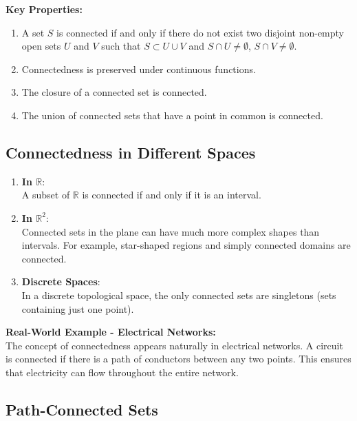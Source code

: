 \documentclass{article}
\begin{document}
\textbf{Key Properties:}
\begin{enumerate}[label=(\arabic*)]
    \item A set $S$ is connected if and only if there do not exist two disjoint non-empty open sets $U$ and $V$ such that $S \subset U \cup V$ and $S \cap U \neq \emptyset$, $S \cap V \neq \emptyset$.
    \item Connectedness is preserved under continuous functions.
    \item The closure of a connected set is connected.
    \item The union of connected sets that have a point in common is connected.
\end{enumerate}

\subsection{Connectedness in Different Spaces} \label{connectedness-spaces}

\begin{enumerate}[label=\textbf{\arabic*.}]
    \item \textbf{In $\mathbb{R}$}: \\
    A subset of $\mathbb{R}$ is connected if and only if it is an interval.
    
    \item \textbf{In $\mathbb{R}^2$}: \\
    Connected sets in the plane can have much more complex shapes than intervals. For example, star-shaped regions and simply connected domains are connected.
    
    \item \textbf{Discrete Spaces}: \\
    In a discrete topological space, the only connected sets are singletons (sets containing just one point).
\end{enumerate}

\textbf{Real-World Example - Electrical Networks:} \\
The concept of connectedness appears naturally in electrical networks. A circuit is connected if there is a path of conductors between any two points. This ensures that electricity can flow throughout the entire network.

\subsection{Path-Connected Sets} \label{path-connected}
\end{document}
